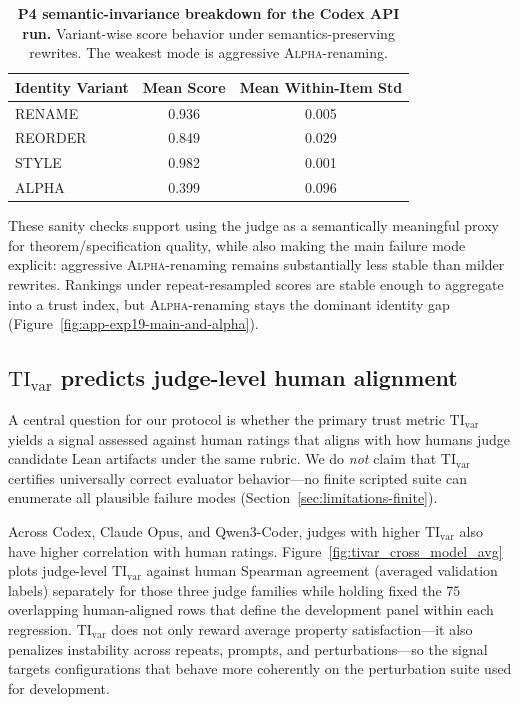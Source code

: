 \documentclass{article}
\begin{document}
\begin{table}[t]
  \centering
  \scriptsize
  \begin{tabular}{lcc}
    \toprule
    \textbf{Identity Variant} & \textbf{Mean Score} & \textbf{Mean Within-Item Std} \\
    \midrule
    RENAME                    & 0.936               & 0.005                         \\
    REORDER                   & 0.849               & 0.029                         \\
    STYLE                     & 0.982               & 0.001                         \\
    ALPHA                     & 0.399               & 0.096                         \\
    \bottomrule
  \end{tabular}
  \caption{\textbf{P4 semantic-invariance breakdown for the Codex API run.}
    Variant-wise score behavior under semantics-preserving rewrites. The weakest mode is aggressive \textsc{Alpha}-renaming.}
  \label{tab:codex_invariance_variants}
\end{table}

These sanity checks support using the judge as a semantically meaningful proxy for theorem/specification quality, while also making the main failure mode explicit: aggressive \textsc{Alpha}-renaming remains substantially less stable than milder rewrites. Rankings under repeat-resampled scores are stable enough to aggregate into a trust index, but \textsc{Alpha}-renaming stays the dominant identity gap (Figure~\ref{fig:app-exp19-main-and-alpha}).

\subsection{\texorpdfstring{\(\mathrm{TI}_{\mathrm{var}}\)}{TI-var} predicts judge-level human alignment}
\label{sec:tivar_cross_model_results}
\label{sec:validation-human-alignment}

A central question for our protocol is whether the primary trust metric \(\mathrm{TI}_{\mathrm{var}}\) yields a signal assessed against human ratings that aligns with how humans judge candidate Lean artifacts under the same rubric. We do \emph{not} claim that \(\mathrm{TI}_{\mathrm{var}}\) certifies universally correct evaluator behavior---no finite scripted suite can enumerate all plausible failure modes (Section~\ref{sec:limitations-finite}).

Across Codex, Claude Opus, and Qwen3-Coder, judges with higher \(\mathrm{TI}_{\mathrm{var}}\) also have higher correlation with human ratings. Figure~\ref{fig:tivar_cross_model_avg} plots judge-level \(\mathrm{TI}_{\mathrm{var}}\) against human Spearman agreement (averaged validation labels) separately for those three judge families while holding fixed the \(75\) overlapping human-aligned rows that define the development panel within each regression. \(\mathrm{TI}_{\mathrm{var}}\) does not only reward average property satisfaction---it also penalizes instability across repeats, prompts, and perturbations---so the signal targets configurations that behave more coherently on the perturbation suite used for development.
\end{document}
